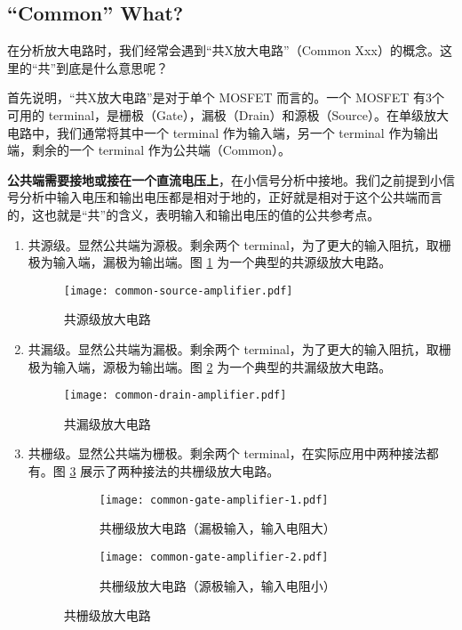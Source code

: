 \subsection{``Common'' What?}
在分析放大电路时，我们经常会遇到“共X放大电路”（Common Xxx）的概念。这里的“共”到底是什么意思呢？

首先说明，“共X放大电路”是对于单个 MOSFET 而言的。一个 MOSFET 有3个可用的 terminal，是栅极（Gate），漏极（Drain）和源极（Source）。在单级放大电路中，我们通常将其中一个 terminal 作为输入端，另一个 terminal 作为输出端，剩余的一个 terminal 作为公共端（Common）。

\textbf{公共端需要接地或接在一个直流电压上}，在小信号分析中接地。我们之前提到小信号分析中输入电压和输出电压都是相对于地的，正好就是相对于这个公共端而言的，这也就是“共”的含义，表明输入和输出电压的值的公共参考点。

\begin{enumerate}
    \item 共源级。显然公共端为源极。剩余两个 terminal，为了更大的输入阻抗，取栅极为输入端，漏极为输出端。图 \ref{fig:common-source-amplifier} 为一个典型的共源级放大电路。
            \begin{figure}[htp!]
                \centering
                \texttt{[image: common-source-amplifier.pdf]}
                \caption{共源级放大电路}
                \label{fig:common-source-amplifier}
            \end{figure}
    \item 共漏级。显然公共端为漏极。剩余两个 terminal，为了更大的输入阻抗，取栅极为输入端，源极为输出端。图 \ref{fig:common-drain-amplifier} 为一个典型的共漏级放大电路。
            \begin{figure}[htp!]
                \centering
                \texttt{[image: common-drain-amplifier.pdf]}
                \caption{共漏级放大电路}
                \label{fig:common-drain-amplifier}
            \end{figure}
    \item 共栅级。显然公共端为栅极。剩余两个 terminal，在实际应用中两种接法都有。图 \ref{fig:common-gate-amplifier} 展示了两种接法的共栅级放大电路。
            \begin{figure}[htp!]
                \centering
                \begin{subfigure}[b]{0.48\textwidth}
                    \centering
                    \texttt{[image: common-gate-amplifier-1.pdf]}
                    \caption{共栅级放大电路（漏极输入，输入电阻大）}
                \end{subfigure}
                \begin{subfigure}[b]{0.48\textwidth}
                    \centering
                    \texttt{[image: common-gate-amplifier-2.pdf]}
                    \caption{共栅级放大电路（源极输入，输入电阻小）}
                \end{subfigure}
                \caption{共栅级放大电路}
                \label{fig:common-gate-amplifier}
            \end{figure}
\end{enumerate}

